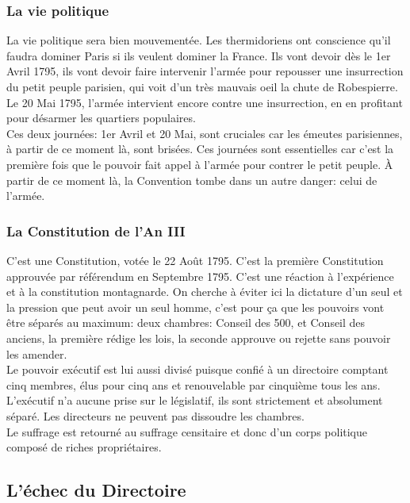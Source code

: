 \documentclass[10pt, a4paper, openany]{book}
\begin{document}
\subsubsection{La vie politique}

La vie politique sera bien mouvementée. Les thermidoriens ont conscience qu'il faudra dominer Paris si ils veulent dominer la France. Ils vont devoir dès le 1er Avril 1795, ils vont devoir faire intervenir l'armée pour repousser une insurrection du petit peuple parisien, qui voit d'un très mauvais oeil la chute de Robespierre. \\
Le 20 Mai 1795, l'armée intervient encore contre une insurrection, en en profitant pour désarmer les quartiers populaires. \\
Ces deux journées: 1er Avril et 20 Mai, sont cruciales car les émeutes parisiennes, à partir de ce moment là, sont brisées. Ces journées sont essentielles car c'est la première fois que le pouvoir fait appel à l'armée pour contrer le petit peuple. À partir de ce moment là, la Convention tombe dans un autre danger: celui de l'armée. 

\subsubsection{La Constitution de l'An III}

C'est une Constitution, votée le 22 Août 1795. C'est la première Constitution approuvée par référendum en Septembre 1795. C'est une réaction à l'expérience et à la constitution montagnarde. On cherche à éviter ici la dictature d'un seul et la pression que peut avoir un seul homme, c'est pour ça que les pouvoirs vont être séparés au maximum: deux chambres: Conseil des 500, et Conseil des anciens, la première rédige les lois, la seconde approuve ou rejette sans pouvoir les amender. \\
Le pouvoir exécutif est lui aussi divisé puisque confié à un directoire comptant cinq membres, élus pour cinq ans et renouvelable par cinquième tous les ans. L'exécutif n'a aucune prise sur le législatif, ils sont strictement et absolument séparé. Les directeurs ne peuvent pas dissoudre les chambres. \\
Le suffrage est retourné au suffrage censitaire et donc d'un corps politique composé de riches propriétaires. 

\subsection{L'échec du Directoire}
\end{document}
